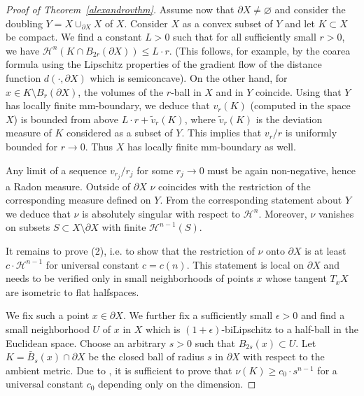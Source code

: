 \documentclass[12pt,leqno,intlimits]{amsart}
\numberwithin{equation}{section}
\theoremstyle{definition}
\theoremstyle{remark}
\newcommand{\vol}{\mathrm{vol}}
\def\emptyset{\varnothing}
\begin{document}
\begin{proof}[Proof of Theorem~\ref{alexandrovthm}]

Assume now that $\partial X\ne\emptyset$ and consider the doubling $Y=X\cup _{\partial X} X$ of $X$. Consider $X$ as a convex subset of $Y$ and let $K\subset X$ be compact.  We find a constant $L>0$ such that for all sufficiently small $r>0$, we have  $\mathcal H^n (K\cap B_{2r} (\partial X)) \leq L \cdot r$. (This follows, for example, by the coarea formula using the Lipschitz properties of the gradient flow of the distance function $d(\cdot, \partial X)$ which is semiconcave).   On the other hand, for $x\in K\setminus B_r (\partial X)$, the volumes of the $r$-ball in $X$ and in $Y$ coincide.  Using that $Y$ has locally finite mm-boundary, we deduce that $v_r(K)$  (computed in the space $X$) is bounded from above  $L\cdot r + \tilde v_r (K)$, where $\tilde v_r (K)$ is the deviation measure of $K$ considered as a subset of $Y$.  This implies that $v_r /r$ is uniformly bounded for $r\to 0$.    Thus $X$ has locally finite mm-boundary as well.

Any limit of a sequence $v_{r_j} /r_j$ for some $r_j\to 0$ must be  again non-negative, hence a Radon measure.  Outside of $\partial X$
   $\nu$ coincides  with the restriction of the corresponding measure defined on $Y$.   From the corresponding statement about  $Y$ we deduce that  $\nu$ is absolutely singular with respect to $\mathcal H^n$. Moreover, $\nu$ vanishes on subsets $S\subset X\setminus \partial X$ with finite $\mathcal H^{n-1}  (S)$.

   It remains to prove (2), i.e. to show that  the restriction of $\nu$ onto $\partial X$ is at least
   $c\cdot \mathcal H^{n-1}$ for  universal constant $c=c(n)$. This statement is local on $\partial X$ and needs to be verified only in small neighborhoods of points $x$  whose tangent $T_xX$
   are isometric to flat halfspaces.

	We fix such a point $x\in \partial X$. We further fix a sufficiently small $\epsilon >0$ and find
	a small neighborhood $U$ of $x$ in $X$ which is
   $(1+\epsilon)$-biLipschitz to a half-ball in the Euclidean space.  Choose an arbitrary $s>0$ such that $B_{2s} (x)\subset U$.
	Let $K= \bar B_s (x) \cap \partial X$ be the closed ball of radius $s$ in $\partial X$  with respect to the ambient metric.  Due to \cite[Section 1.6]{Evans},
	 it is sufficient to prove that $\nu (K) \geq  c_0 \cdot s^{n-1}$  for a universal constant $c_0$ depending only on the dimension.
	

\end{proof}
\end{document}
